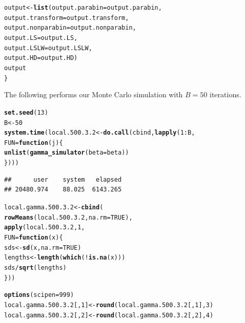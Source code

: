\documentclass[11pt]{article}\usepackage[]{graphicx}\usepackage[]{color}
\makeatletter
\newcommand{\hlnum}[1]{\textcolor[rgb]{0.686,0.059,0.569}{#1}}%
\newcommand{\hlopt}[1]{\textcolor[rgb]{0,0,0}{#1}}%
\newcommand{\hlstd}[1]{\textcolor[rgb]{0.345,0.345,0.345}{#1}}%
\newcommand{\hlkwa}[1]{\textcolor[rgb]{0.161,0.373,0.58}{\textbf{#1}}}%
\newcommand{\hlkwb}[1]{\textcolor[rgb]{0.69,0.353,0.396}{#1}}%
\newcommand{\hlkwc}[1]{\textcolor[rgb]{0.333,0.667,0.333}{#1}}%
\newcommand{\hlkwd}[1]{\textcolor[rgb]{0.737,0.353,0.396}{\textbf{#1}}}%
\newenvironment{kframe}{%
 \def\at@end@of@kframe{}%
 \ifinner\ifhmode%
  \def\at@end@of@kframe{\end{minipage}}%
  \begin{minipage}{\columnwidth}%
 \fi\fi%
 \def\FrameCommand##1{\hskip\@totalleftmargin \hskip-\fboxsep
 \colorbox{shadecolor}{##1}\hskip-\fboxsep
     \hskip-\linewidth \hskip-\@totalleftmargin \hskip\columnwidth}%
 \MakeFramed {\advance\hsize-\width
   \@totalleftmargin\z@ \linewidth\hsize
   \@setminipage}}%
 {\par\unskip\endMakeFramed%
 \at@end@of@kframe}
\newenvironment{knitrout}{}{} %
\makeatother
\begin{document}
\begin{knitrout}
\begin{kframe}
\begin{alltt}
  \hlstd{output} \hlkwb{<-} \hlkwd{list}\hlstd{(}\hlkwc{output.parabin} \hlstd{= output.parabin,}
    \hlkwc{output.transform} \hlstd{= output.transform,}
    \hlkwc{output.nonparabin} \hlstd{= output.nonparabin,}
    \hlkwc{output.LS} \hlstd{= output.LS,}
    \hlkwc{output.LSLW} \hlstd{= output.LSLW,}
    \hlkwc{output.HD} \hlstd{= output.HD)}
  \hlstd{output}
\hlstd{\}}
\end{alltt}
\end{kframe}
\end{knitrout}

The following performs our Monte Carlo simulation with $B = 50$ iterations. 

\begin{knitrout}
\color{fgcolor}\begin{kframe}
\begin{alltt}
\hlkwd{set.seed}\hlstd{(}\hlnum{13}\hlstd{)}
\hlstd{B} \hlkwb{<-} \hlnum{50}
\hlkwd{system.time}\hlstd{(local.500.3.2} \hlkwb{<-} \hlkwd{do.call}\hlstd{(cbind,} \hlkwd{lapply}\hlstd{(}\hlnum{1}\hlopt{:}\hlstd{B,}
  \hlkwc{FUN} \hlstd{=} \hlkwa{function}\hlstd{(}\hlkwc{j}\hlstd{)\{}
    \hlkwd{unlist}\hlstd{(}\hlkwd{gamma_simulator}\hlstd{(}\hlkwc{beta} \hlstd{= beta))}
\hlstd{\})))}
\end{alltt}
\begin{verbatim}
##      user    system   elapsed 
## 20480.974    88.025  6143.265
\end{verbatim}
\end{kframe}
\end{knitrout}

\begin{knitrout}
\color{fgcolor}\begin{kframe}
\begin{alltt}
\hlstd{local.gamma.500.3.2} \hlkwb{<-} \hlkwd{cbind}\hlstd{(}
  \hlkwd{rowMeans}\hlstd{(local.500.3.2,} \hlkwc{na.rm} \hlstd{=} \hlnum{TRUE}\hlstd{),}
  \hlkwd{apply}\hlstd{(local.500.3.2,} \hlnum{1}\hlstd{,}
  \hlkwc{FUN} \hlstd{=} \hlkwa{function}\hlstd{(}\hlkwc{x}\hlstd{)\{}
    \hlstd{sds} \hlkwb{<-} \hlkwd{sd}\hlstd{(x,} \hlkwc{na.rm} \hlstd{=} \hlnum{TRUE}\hlstd{)}
    \hlstd{lengths} \hlkwb{<-} \hlkwd{length}\hlstd{(}\hlkwd{which}\hlstd{(}\hlopt{!}\hlkwd{is.na}\hlstd{(x)))}
    \hlstd{sds} \hlopt{/} \hlkwd{sqrt}\hlstd{(lengths)}
  \hlstd{\}))}

\hlkwd{options}\hlstd{(}\hlkwc{scipen} \hlstd{=} \hlnum{999}\hlstd{)}
\hlstd{local.gamma.500.3.2[,} \hlnum{1}\hlstd{]} \hlkwb{<-} \hlkwd{round}\hlstd{(local.gamma.500.3.2[,} \hlnum{1}\hlstd{],} \hlnum{3}\hlstd{)}
\hlstd{local.gamma.500.3.2[,} \hlnum{2}\hlstd{]} \hlkwb{<-} \hlkwd{round}\hlstd{(local.gamma.500.3.2[,} \hlnum{2}\hlstd{],} \hlnum{4}\hlstd{)}
\end{alltt}
\end{kframe}
\end{knitrout}
\end{document}
